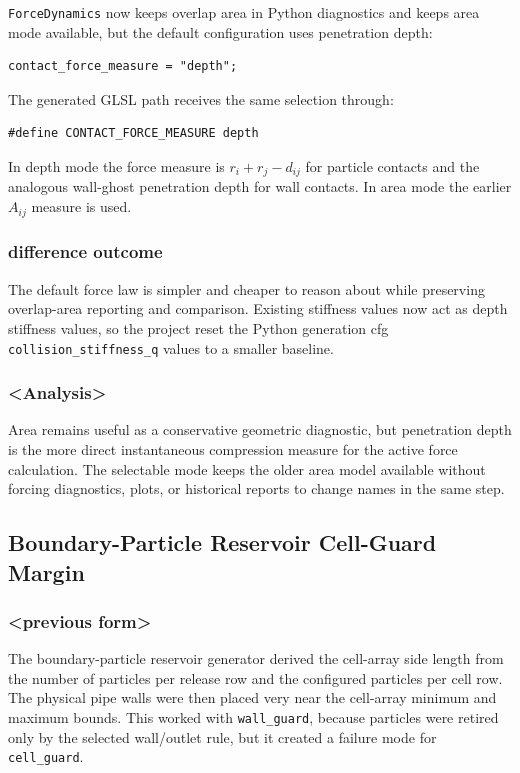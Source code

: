 \texttt{ForceDynamics} now keeps overlap area in Python diagnostics and keeps
area mode available, but the default configuration uses penetration depth:
\begin{verbatim}
contact_force_measure = "depth";
\end{verbatim}
The generated GLSL path receives the same selection through:
\begin{verbatim}
#define CONTACT_FORCE_MEASURE depth
\end{verbatim}
In depth mode the force measure is \(r_i+r_j-d_{ij}\) for particle contacts
and the analogous wall-ghost penetration depth for wall contacts.  In area
mode the earlier \(A_{ij}\) measure is used.

\subsubsection{difference outcome}

The default force law is simpler and cheaper to reason about while preserving
overlap-area reporting and comparison.  Existing stiffness values now act as
depth stiffness values, so the project reset the Python generation cfg
\texttt{collision\_stiffness\_q} values to a smaller baseline.

\subsubsection{<Analysis>}

Area remains useful as a conservative geometric diagnostic, but penetration
depth is the more direct instantaneous compression measure for the active
force calculation.  The selectable mode keeps the older area model available
without forcing diagnostics, plots, or historical reports to change names in
the same step.

\subsection{Boundary-Particle Reservoir Cell-Guard Margin}

\subsubsection{<previous form>}

The boundary-particle reservoir generator derived the cell-array side length
from the number of particles per release row and the configured particles per
cell row.  The physical pipe walls were then placed very near the cell-array
minimum and maximum bounds.  This worked with \texttt{wall\_guard}, because
particles were retired only by the selected wall/outlet rule, but it created a
failure mode for \texttt{cell\_guard}.

